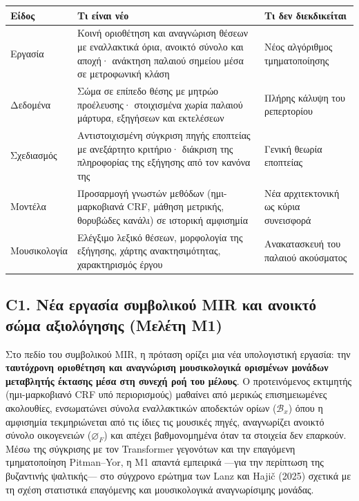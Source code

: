 \documentclass[11pt,a4paper]{article}
\begin{document}
\begin{center}\small
\begin{tabularx}{\linewidth}{@{}L{2.6cm}YY@{}}
\toprule
\textbf{Είδος} & \textbf{Τι είναι νέο} & \textbf{Τι δεν διεκδικείται}\\\midrule
Εργασία & Κοινή οριοθέτηση και αναγνώριση θέσεων με εναλλακτικά όρια, ανοικτό σύνολο και αποχή· ανάκτηση παλαιού σημείου μέσα σε μετροφωνική κλάση & Νέος αλγόριθμος τμηματοποίησης\\
Δεδομένα & Σώμα σε επίπεδο θέσης με μητρώο προέλευσης· στοιχισμένα χωρία παλαιού μάρτυρα, εξηγήσεων και εκτελέσεων & Πλήρης κάλυψη του ρεπερτορίου\\
Σχεδιασμός & Αντιστοιχισμένη σύγκριση πηγής εποπτείας με ανεξάρτητο κριτήριο· διάκριση της πληροφορίας της εξήγησης από τον κανόνα της & Γενική θεωρία εποπτείας\\
Μοντέλα & Προσαρμογή γνωστών μεθόδων (ημι-μαρκοβιανά CRF, μάθηση μετρικής, θορυβώδες κανάλι) σε ιστορική αμφισημία & Νέα αρχιτεκτονική ως κύρια συνεισφορά\\
Μουσικολογία & Ελέγξιμο λεξικό θέσεων, μορφολογία της εξήγησης, χάρτης ανακτησιμότητας, χαρακτηρισμός έργου & Ανακατασκευή του παλαιού ακούσματος\\\bottomrule
\end{tabularx}
\end{center}

\subsection{C1. Νέα εργασία συμβολικού MIR και ανοικτό σώμα αξιολόγησης (Μελέτη Μ1)}\label{c1.-ux3bdux3adux3b1-ux3b5ux3c1ux3b3ux3b1ux3c3ux3afux3b1-ux3c3ux3c5ux3bcux3b2ux3bfux3bbux3b9ux3baux3bfux3cd-mir-ux3baux3b1ux3b9-ux3b1ux3bdux3bfux3b9ux3baux3c4ux3cc-ux3c3ux3ceux3bcux3b1-ux3b1ux3beux3b9ux3bfux3bbux3ccux3b3ux3b7ux3c3ux3b7ux3c2-ux3bcux3b5ux3bbux3adux3c4ux3b7-ux3bc1}

Στο πεδίο του συμβολικού MIR, η πρόταση ορίζει μια νέα υπολογιστική εργασία: την \textbf{ταυτόχρονη οριοθέτηση και αναγνώριση μουσικολογικά ορισμένων μονάδων μεταβλητής έκτασης μέσα στη συνεχή ροή του μέλους}. Ο προτεινόμενος εκτιμητής (ημι-μαρκοβιανό CRF υπό περιορισμούς) μαθαίνει από μερικώς επισημειωμένες ακολουθίες, ενσωματώνει σύνολα εναλλακτικών αποδεκτών ορίων (\(\mathcal{B}_x\)) όπου η αμφισημία τεκμηριώνεται από τις ίδιες τις μουσικές πηγές, αναγνωρίζει ανοικτό σύνολο οικογενειών (\(\varnothing_F\)) και απέχει βαθμονομημένα όταν τα στοιχεία δεν επαρκούν. Μέσω της σύγκρισης με τον Transformer γεγονότων και την επαγόμενη τμηματοποίηση Pitman--Yor, η Μ1 απαντά εμπειρικά ---για την περίπτωση της βυζαντινής ψαλτικής--- στο σύγχρονο ερώτημα των Lanz και Hajič (2025) σχετικά με τη σχέση στατιστικά επαγόμενης και μουσικολογικά αναγνωρίσιμης μονάδας.
\end{document}
